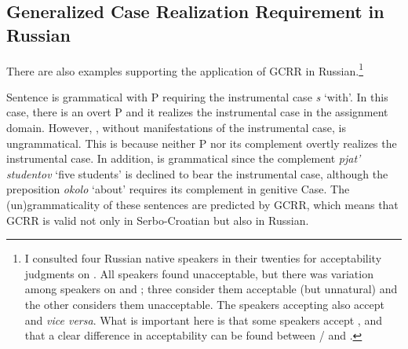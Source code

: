 \documentclass[output=paper,
]{langscibook}
\begin{document}
\subsection{Generalized Case Realization Requirement in Russian}

There are also examples supporting the application of GCRR in Russian.\footnote{
            I consulted four Russian native speakers in their twenties for acceptability judgments on . All speakers found  unacceptable, but there was variation among speakers on  and ; three consider them acceptable (but unnatural) and the other considers them unacceptable. The speakers accepting  also accept  and \textit{vice versa}. What is important here is that some speakers accept ,  and that a clear difference in acceptability can be found between  / and .
            }

\begin{exe}
\ex \label{gcrrRR}%
\begin{xlist}
\end{xlist}
\end{exe}

\noindent
Sentence  is grammatical with P requiring the instrumental case \textit{s} `with'. In this case, there is an overt P and it realizes the instrumental case in the assignment domain.
However, , without manifestations of the instrumental case, is ungrammatical. This is because neither P nor its complement overtly realizes the instrumental case.
In addition,  is grammatical since the complement \textit{pjat' studentov} `five students' is declined to bear the instrumental case, although the preposition \textit{okolo} `about' 
requires its complement in genitive Case.
The (un)grammaticality of these sentences are predicted by GCRR, which means that GCRR is valid not only in Serbo-Croatian but also in Russian.
\end{document}
